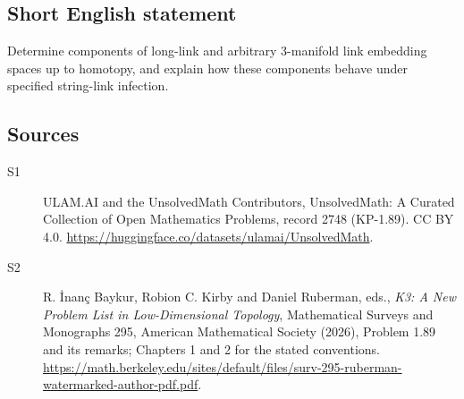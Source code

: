 \documentclass[11pt]{article}
\begin{document}
\subsection{Short English statement}
Determine components of long-link and arbitrary 3-manifold link embedding spaces up to homotopy, and explain how these components behave under specified string-link infection.
\subsection{Sources}
\begin{description}
\item[\hypertarget{source:2748:1}{S1}] ULAM.AI and the UnsolvedMath Contributors, UnsolvedMath: A Curated Collection of Open Mathematics Problems, record 2748 (KP-1.89). CC BY 4.0. \url{https://huggingface.co/datasets/ulamai/UnsolvedMath}.
\item[\hypertarget{source:2748:2}{S2}] R. İnanç Baykur, Robion C. Kirby and Daniel Ruberman, eds., \emph{K3: A New Problem List in Low-Dimensional Topology}, Mathematical Surveys and Monographs 295, American Mathematical Society (2026), Problem 1.89 and its remarks; Chapters 1 and 2 for the stated conventions. \url{https://math.berkeley.edu/sites/default/files/surv-295-ruberman-watermarked-author-pdf.pdf}.
\end{description}
\label{end:2748}
\end{document}
